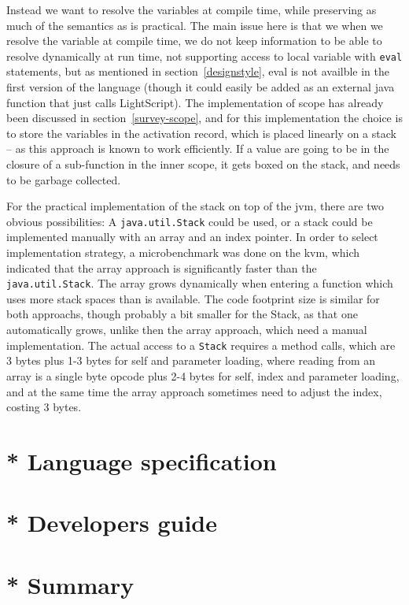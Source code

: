 Instead we want to resolve the variables at compile time, while preserving as much of the semantics as is practical. The main issue here is that we when we resolve the variable at compile time, we do not keep information to be able to resolve dynamically at run time, not supporting access to local variable with \verb|eval| statements, but as mentioned in section~\ref{designstyle}, eval is not availble in the first version of the language (though it could easily be added as an external java function that just calls LightScript).
The implementation of scope has already been discussed in section~\ref{survey-scope}, and for this implementation the choice is to store the variables in the activation record, which is placed linearly on a stack -- as this approach is known to work efficiently. 
If a value are going to be in the closure of a sub-function in the inner scope, it gets boxed on the stack, and needs to be garbage collected.

For the practical implementation of the stack on top of the jvm, there are two obvious possibilities: A \verb|java.util.Stack| could be used, or a stack could be implemented manually with an array and an index pointer. 
In order to select implementation strategy, a microbenchmark was done on the kvm, which indicated that the array approach is significantly faster than the \verb|java.util.Stack|. The array grows dynamically when entering a function which uses more stack spaces than is available. 
The code footprint size is similar for both approachs, though probably a bit smaller for the Stack, as that one automatically grows, unlike then the array approach, which need a manual implementation.
The actual access to a \verb|Stack| requires a method calls, which are 3 bytes plus 1-3 bytes for self and parameter loading, where reading from an array is a single byte opcode plus 2-4 bytes for self, index and parameter loading, and at the same time the array approach sometimes need to adjust the index, costing 3 bytes.

\section{* Language specification}
\section{* Developers guide}
\section{* Summary}
